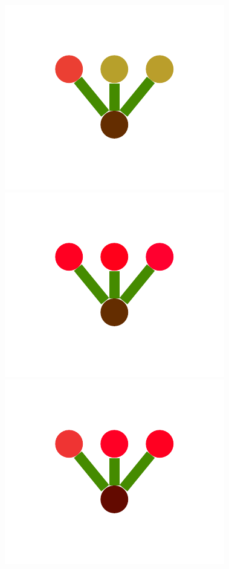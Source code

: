 \documentclass[a4paper,10pt]{article}
\begin{document}
\begin{figure}
{    \includegraphics[scale=.2]{../figures/vector/6-2-multiple-color-flower-data-3.pdf}
    \includegraphics[scale=.2]{../figures/vector/6-2-multiple-color-flower-data-4.pdf}
    \includegraphics[scale=.2]{../figures/vector/6-2-multiple-color-flower-data-5.pdf}
}
\end{figure}
\end{document}
